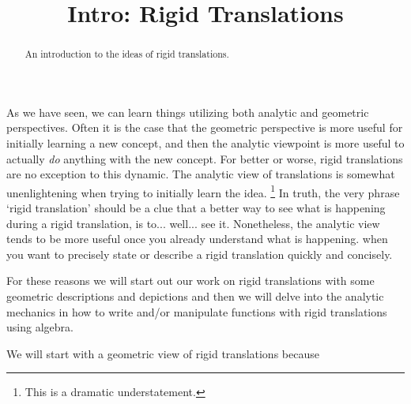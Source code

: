 \documentclass{ximeraXloud}
\title{Intro: Rigid Translations}
\begin{document}
\begin{abstract}
    An introduction to the ideas of rigid translations.
\end{abstract}
\maketitle

As we have seen, we can learn things utilizing both analytic and geometric perspectives. Often it is the case that the geometric perspective is more useful for initially learning a new concept, and then the analytic viewpoint is more useful to actually \textit{do} anything with the new concept. For better or worse, rigid translations are no exception to this dynamic. The analytic view of translations is somewhat unenlightening when trying to initially learn the idea.%
\footnote{%
    This is a dramatic understatement.%
    }
In truth, the very phrase `rigid translation' should be a clue that a better way to see what is happening during a rigid translation, is to... well... see it. Nonetheless, the analytic view tends to be more useful once you already understand what is happening. when you want to precisely state or describe a rigid translation quickly and concisely.

For these reasons we will start out our work on rigid translations with some geometric descriptions and depictions and then we will delve into the analytic mechanics in how to write and/or manipulate functions with rigid translations using algebra.

\begin{problem}
    We will start with a geometric view of rigid translations because
    \begin{multipleChoice}
    \end{multipleChoice}
\end{problem}
\end{document}
